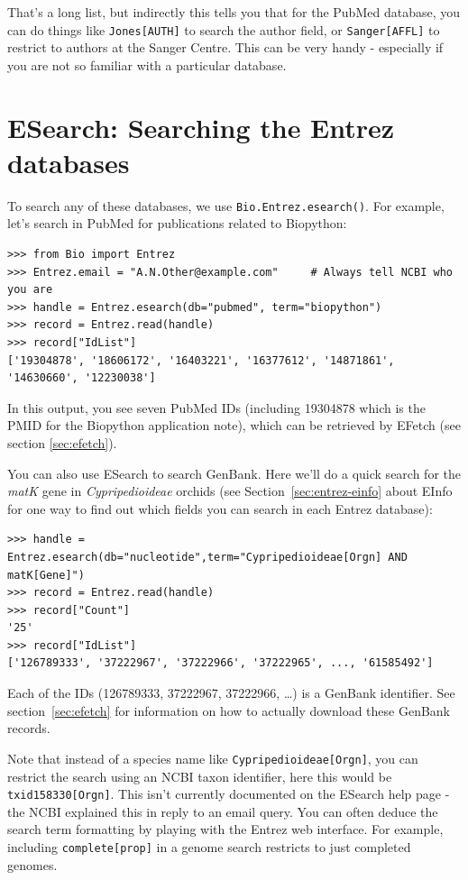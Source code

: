 \documentclass{report}
\begin{document}
That's a long list, but indirectly this tells you that for the PubMed
database, you can do things like \texttt{Jones[AUTH]} to search the
author field, or \texttt{Sanger[AFFL]} to restrict to authors at the
Sanger Centre. This can be very handy - especially if you are not so
familiar with a particular database.

\section{ESearch: Searching the Entrez databases}
\label{sec:entrez-esearch}
To search any of these databases, we use \verb+Bio.Entrez.esearch()+. For example, let's search in PubMed for publications related to Biopython:
\begin{verbatim}
>>> from Bio import Entrez
>>> Entrez.email = "A.N.Other@example.com"     # Always tell NCBI who you are
>>> handle = Entrez.esearch(db="pubmed", term="biopython")
>>> record = Entrez.read(handle)
>>> record["IdList"]
['19304878', '18606172', '16403221', '16377612', '14871861', '14630660', '12230038']
\end{verbatim}
In this output, you see seven PubMed IDs (including 19304878 which is the PMID for the Biopython application note), which can be retrieved by EFetch (see section \ref{sec:efetch}).

You can also use ESearch to search GenBank. Here we'll do a quick
search for the \emph{matK} gene in \emph{Cypripedioideae} orchids
(see Section~\ref{sec:entrez-einfo} about EInfo for one way to
find out which fields you can search in each Entrez database):

\begin{verbatim}
>>> handle = Entrez.esearch(db="nucleotide",term="Cypripedioideae[Orgn] AND matK[Gene]")
>>> record = Entrez.read(handle)
>>> record["Count"]
'25'
>>> record["IdList"]
['126789333', '37222967', '37222966', '37222965', ..., '61585492']
\end{verbatim}

\noindent Each of the IDs (126789333, 37222967, 37222966, \ldots) is a GenBank identifier.
See section~\ref{sec:efetch} for information on how to actually download these GenBank records.

Note that instead of a species name like \texttt{Cypripedioideae[Orgn]}, you can restrict the search using an NCBI taxon identifier, here this would be \texttt{txid158330[Orgn]}.  This isn't currently documented on the ESearch help page - the NCBI explained this in reply to an email query.  You can often deduce the search term formatting by playing with the Entrez web interface.  For example, including \texttt{complete[prop]} in a genome search restricts to just completed genomes.
\end{document}
